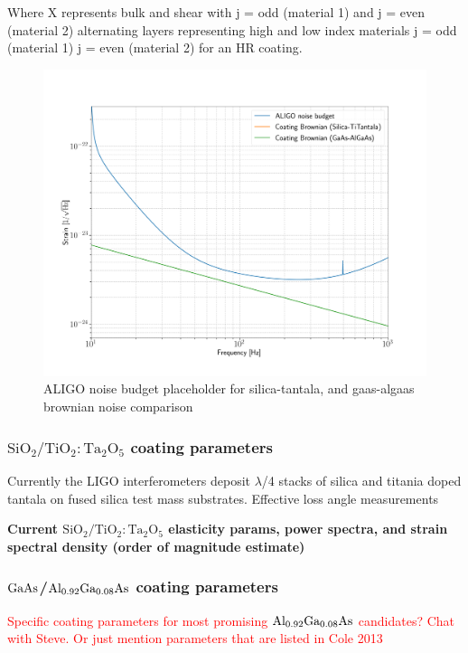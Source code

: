 Where X represents bulk and shear with j = odd (material 1) and j = even (material 2) alternating layers representing high and low index materials j = odd (material 1) j = even (material 2) for an HR coating.

\begin{figure}[H]
\begin{center}
\includegraphics[width=\textwidth]{figs/ALGAAS/aligo_nb_plus_cbn.png}
\end{center}
\caption{ALIGO noise budget placeholder for silica-tantala, and gaas-algaas brownian noise comparison}
\label{fig:aligo_tn_comparison}
\end{figure}

\subsubsection{$\mathrm{SiO_2}/\mathrm{TiO_2:Ta_2O_5}$ coating parameters}
Currently the LIGO interferometers deposit $\lambda$/4 stacks of silica and titania doped tantala on fused silica test mass substrates. Effective loss angle measurements \cite{Harry:06}

\textbf{Current $\mathrm{SiO_2}/\mathrm{TiO_2:Ta_2O_5}$ elasticity params, power spectra, and strain spectral density (order of magnitude estimate)}

\subsubsection{$\mathrm{GaAs}$/$\mathrm{Al_{0.92}Ga_{0.08}As}$ coating parameters}
\textcolor{red}{Specific coating parameters for most promising $\mathrm{Al_{0.92}Ga_{0.08}As}$ candidates? Chat with Steve. Or just mention parameters that are listed in Cole 2013}
\cite{Cole:2013}

